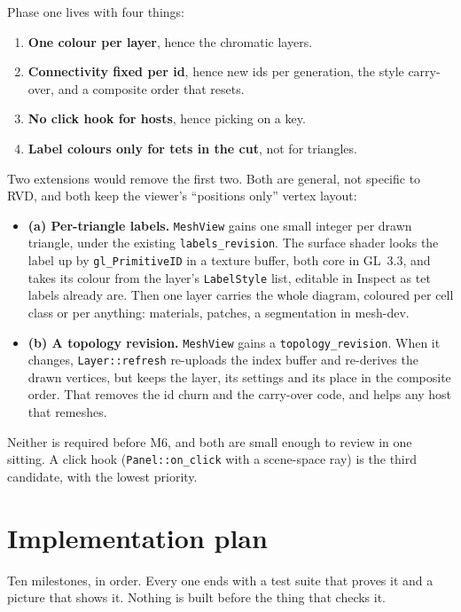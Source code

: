\documentclass[11pt,a4paper]{article}
\newcommand{\code}[1]{\texttt{#1}}          %
\begin{document}
Phase one lives with four things:

\begin{enumerate}
\item \textbf{One colour per layer}, hence the chromatic layers.
\item \textbf{Connectivity fixed per id}, hence new ids per generation, the style carry-over, and
  a composite order that resets.
\item \textbf{No click hook for hosts}, hence picking on a key.
\item \textbf{Label colours only for tets in the cut}, not for triangles.
\end{enumerate}

Two extensions would remove the first two. Both are general, not specific to RVD, and both keep
the viewer's ``positions only'' vertex layout:

\begin{itemize}
\item \textbf{(a) Per-triangle labels.} \code{MeshView} gains one small integer per drawn
  triangle, under the existing \code{labels\_revision}. The surface shader looks the label up by
  \code{gl\_PrimitiveID} in a texture buffer, both core in GL~3.3, and takes its colour from the
  layer's \code{LabelStyle} list, editable in Inspect as tet labels already are. Then one layer
  carries the whole diagram, coloured per cell class or per anything: materials, patches, a
  segmentation in mesh-dev.
\item \textbf{(b) A topology revision.} \code{MeshView} gains a \code{topology\_revision}. When it
  changes, \code{Layer::refresh} re-uploads the index buffer and re-derives the drawn vertices,
  but keeps the layer, its settings and its place in the composite order. That removes the id
  churn and the carry-over code, and helps any host that remeshes.
\end{itemize}

Neither is required before M6, and both are small enough to review in one sitting. A click hook
(\code{Panel::on\_click} with a scene-space ray) is the third candidate, with the lowest
priority.

\section{Implementation plan}\label{sec:plan}

Ten milestones, in order. Every one ends with a test suite that proves it and a picture that
shows it. Nothing is built before the thing that checks it.
\end{document}
